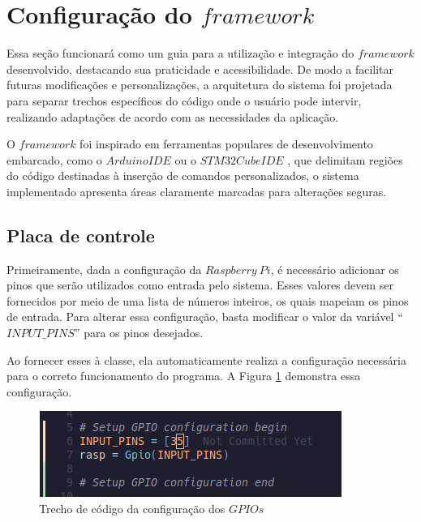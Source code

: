 \documentclass{ecatfg}
\begin{document}
\section{Configuração do $framework$}
Essa seção funcionará como um guia para a utilização e integração do $framework$ desenvolvido, destacando sua praticidade e acessibilidade. De modo a facilitar futuras modificações e personalizações, a arquitetura do sistema foi projetada para separar trechos específicos do código onde o usuário pode intervir, realizando adaptações de acordo com as necessidades da aplicação.\par

O $framework$ foi inspirado em ferramentas populares de desenvolvimento embarcado, como o $Arduino IDE$ \cite{arduino_ide} ou o $STM32CubeIDE$ \cite{stm}, que delimitam regiões do código destinadas à inserção de comandos personalizados, o sistema implementado apresenta áreas claramente marcadas para alterações seguras.\par

\subsection{Placa de controle}
Primeiramente, dada a configuração da $Raspberry\ Pi$, é necessário adicionar os pinos que serão utilizados como entrada pelo sistema. Esses valores devem ser fornecidos por meio de uma lista de números inteiros, os quais mapeiam os pinos de entrada. Para alterar essa configuração, basta modificar o valor da variável “$INPUT\_PINS$” para os pinos desejados. \par

Ao fornecer esses à classe, ela automaticamente realiza a configuração necessária para o correto funcionamento do programa. A Figura \ref{fig:framework_rasp} demonstra essa configuração. \par

\begin{figure}[!htb]
    \centering
    \includegraphics[scale=0.55]{Figuras/gpio_framework.png}
    \caption{Trecho de código da configuração dos $GPIOs$}
    \label{fig:framework_rasp}
\end{figure}
\end{document}
